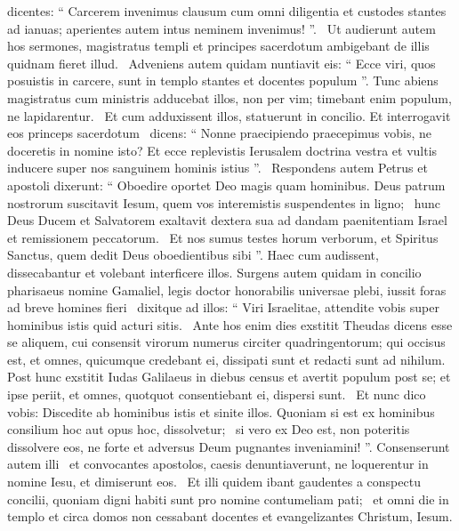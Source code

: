 \begin{biblechapter}
\begin{biblechapter}
\begin{biblechapter}
\begin{biblechapter}
\begin{biblechapter}
 \verse dicentes: “ Carcerem invenimus clausum cum omni diligentia et custodes stantes ad ianuas; aperientes autem intus neminem invenimus! ”. 
 \verse Ut audierunt autem hos sermones, magistratus templi et principes sacerdotum ambigebant de illis quidnam fieret illud. 
 \verse Adveniens autem quidam nuntiavit eis: “ Ecce viri, quos posuistis in carcere, sunt in templo stantes et docentes populum ”.
 \verse Tunc abiens magistratus cum ministris adducebat illos, non per vim; timebant enim populum, ne lapidarentur. 
 \verse Et cum adduxissent illos, statuerunt in concilio. Et interrogavit eos princeps sacerdotum 
 \verse dicens: “ Nonne praecipiendo praecepimus vobis, ne doceretis in nomine isto? Et ecce replevistis Ierusalem doctrina vestra et vultis inducere super nos sanguinem hominis istius ”. 
 \verse Respondens autem Petrus et apostoli dixerunt: “ Oboedire oportet Deo magis quam hominibus.
\verse Deus patrum nostrorum suscitavit Iesum, quem vos interemistis suspendentes in ligno; 
 \verse hunc Deus Ducem et Salvatorem exaltavit dextera sua ad dandam paenitentiam Israel et remissionem peccatorum. 
 \verse Et nos sumus testes horum verborum, et Spiritus Sanctus, quem dedit Deus oboedientibus sibi ”.
\verse Haec cum audissent, dissecabantur et volebant interficere illos.
\verse Surgens autem quidam in concilio pharisaeus nomine Gamaliel, legis doctor honorabilis universae plebi, iussit foras ad breve homines fieri 
 \verse dixitque ad illos: “ Viri Israelitae, attendite vobis super hominibus istis quid acturi sitis. 
 \verse Ante hos enim dies exstitit Theudas dicens esse se aliquem, cui consensit virorum numerus circiter quadringentorum; qui occisus est, et omnes, quicumque credebant ei, dissipati sunt et redacti sunt ad nihilum. 
 \verse Post hunc exstitit Iudas Galilaeus in diebus census et avertit populum post se; et ipse periit, et omnes, quotquot consentiebant ei, dispersi sunt. 
 \verse Et nunc dico vobis: Discedite ab hominibus istis et sinite illos. Quoniam si est ex hominibus consilium hoc aut opus hoc, dissolvetur; 
 \verse si vero ex Deo est, non poteritis dissolvere eos, ne forte et adversus Deum pugnantes inveniamini! ”.
 Consenserunt autem illi 
 \verse et convocantes apostolos, caesis denuntiaverunt, ne loquerentur in nomine Iesu, et dimiserunt eos. 
 \verse Et illi quidem ibant gaudentes a conspectu concilii, quoniam digni habiti sunt pro nomine contumeliam pati; 
 \verse et omni die in templo et circa domos non cessabant docentes et evangelizantes Christum, Iesum.
 

\end{biblechapter}
\end{biblechapter}
\end{biblechapter}
\end{biblechapter}
\end{biblechapter}
